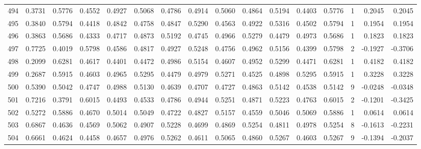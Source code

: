 \begin{tabular}{lrrrrrrrrrrrrrrr}
494 &      0.3731 &  0.5776 &  0.4552 &  0.4927 &  0.5068 &  0.4786 &  0.4914 &  0.5060 &  0.4864 &  0.5194 &   0.4403 &     0.5776 &      1 &                    0.2045 &                     0.2045 \\
495 &      0.3840 &  0.5794 &  0.4418 &  0.4842 &  0.4758 &  0.4847 &  0.5290 &  0.4563 &  0.4922 &  0.5316 &   0.4502 &     0.5794 &      1 &                    0.1954 &                     0.1954 \\
496 &      0.3863 &  0.5686 &  0.4333 &  0.4717 &  0.4873 &  0.5192 &  0.4745 &  0.4966 &  0.5279 &  0.4479 &   0.4973 &     0.5686 &      1 &                    0.1823 &                     0.1823 \\
497 &      0.7725 &  0.4019 &  0.5798 &  0.4586 &  0.4817 &  0.4927 &  0.5248 &  0.4756 &  0.4962 &  0.5156 &   0.4399 &     0.5798 &      2 &                   -0.1927 &                    -0.3706 \\
498 &      0.2099 &  0.6281 &  0.4617 &  0.4401 &  0.4472 &  0.4986 &  0.5154 &  0.4607 &  0.4952 &  0.5299 &   0.4471 &     0.6281 &      1 &                    0.4182 &                     0.4182 \\
499 &      0.2687 &  0.5915 &  0.4603 &  0.4965 &  0.5295 &  0.4479 &  0.4979 &  0.5271 &  0.4525 &  0.4898 &   0.5295 &     0.5915 &      1 &                    0.3228 &                     0.3228 \\
500 &      0.5390 &  0.5042 &  0.4747 &  0.4988 &  0.5130 &  0.4639 &  0.4707 &  0.4727 &  0.4863 &  0.5142 &   0.4538 &     0.5142 &      9 &                   -0.0248 &                    -0.0348 \\
501 &      0.7216 &  0.3791 &  0.6015 &  0.4493 &  0.4533 &  0.4786 &  0.4944 &  0.5251 &  0.4871 &  0.5223 &   0.4763 &     0.6015 &      2 &                   -0.1201 &                    -0.3425 \\
502 &      0.5272 &  0.5886 &  0.4670 &  0.5014 &  0.5049 &  0.4722 &  0.4827 &  0.5157 &  0.4559 &  0.5046 &   0.5069 &     0.5886 &      1 &                    0.0614 &                     0.0614 \\
503 &      0.6867 &  0.4636 &  0.4569 &  0.5062 &  0.4907 &  0.5228 &  0.4699 &  0.4869 &  0.5254 &  0.4811 &   0.4978 &     0.5254 &      8 &                   -0.1613 &                    -0.2231 \\
504 &      0.6661 &  0.4624 &  0.4458 &  0.4657 &  0.4976 &  0.5262 &  0.4611 &  0.5065 &  0.4860 &  0.5267 &   0.4603 &     0.5267 &      9 &                   -0.1394 &                    -0.2037 \\

\end{tabular}
